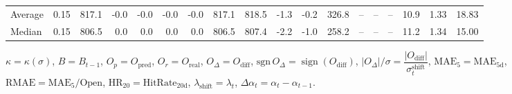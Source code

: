 \begin{threeparttable}
{\begin{tabular}{lrrrrrrrrrrrrrrrrr}
Average &     0.15 & 817.1 &              -0.0 &              -0.0 &               -0.0 &               -0.0 & 817.1 & 818.5 &       -1.3 &                     -0.2 &               326.8 &         -- &        -- &             -- &             10.9 &            1.33 &                  18.83 \\
 Median &     0.15 & 806.5 &               0.0 &               0.0 &                0.0 &                0.0 & 806.5 & 807.4 &       -2.2 &                     -1.0 &               258.2 &         -- &        -- &             -- &             11.2 &            1.34 &                  15.00 \\
\bottomrule
\end{tabular}
}
\begin{tablenotes}\footnotesize
\item $\kappa=\kappa(\sigma)$, $B=B_{t-1}$, $O_p=O_{\text{pred}}$, $O_r=O_{\text{real}}$, $O_\Delta=O_{\text{diff}}$, $\mathrm{sgn}\,O_\Delta=\operatorname{sign}(O_{\text{diff}})$, $|O_\Delta|/\sigma=\dfrac{|O_{\text{diff}}|}{\sigma_t^{\text{shift}}}$, $\mathrm{MAE}_5=\mathrm{MAE}_{5\text{d}}$, $\mathrm{RMAE}= \mathrm{MAE}_5 / \text{Open}$, $\mathrm{HR}_{20}=\mathrm{HitRate}_{20\text{d}}$, 
$\lambda_{\text{shift}}=\lambda_t$, 
$\Delta\alpha_t=\alpha_t-\alpha_{t-1}$.
\end{tablenotes}
\end{threeparttable}
\endgroup

